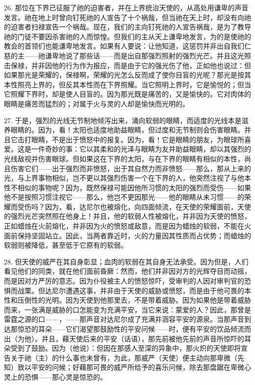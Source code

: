 26. 那位在下界已征服了祂的迫害者，并在上界统治天使的，从高处用谦卑的声音发言。祂在地上时曾向钉死祂的人宣告了十个祸哉，但当祂在天上时，却没有向祂的迫害者扫禄宣告一个祸哉。现在，我们的主向钉死祂的人宣告祸哉，是为了教导祂的门徒不要因杀害祂的人而惊惶。但我们的主从天上谦卑地发言，为的是使祂的教会的首领们也能谦卑地发言。如果有人要说：让他知道，这惩罚并非出自我们仁慈的主——祂谦卑地说了那些话——而是出自那强烈照射的强烈光芒。并且这光照击保禄，并非因他的行为作为报应，而是由于它的强光伤了他，正如他也说过：但如果那光是荣耀的，保禄啊，荣耀的光怎么反而成了使你目盲的光呢？那光是按其本性照亮上界的，但反其本性而在下界照耀。当它照明上界时，它是愉悦的；但当它照耀下界时，却是使人目盲的。因为那光既是痛苦的，又是愉快的。它对肉体的眼睛是痛苦而猛烈的；对属于火与灵的人却是愉快而光明的。\par

27. 于是，强烈的光线无节制地倾泻出来，涌向软弱的眼睛，而适度的光线本是滋养眼睛的。因为，看！太阳也适度地助益眼睛，但过度和无节制则会伤害眼睛。并且它击打眼睛，不是出于愤怒中的报复。因为，看！它是眼睛的朋友，为眼球所喜爱。这是一件奇妙的事：它以其柔和的光泽与眼睛为友并助益眼睛，却以其强烈的光线敌视并伤害眼球。但如果这在下界的太阳，与在下界的眼睛有相似的本性，尚且伤害它们——出于强烈而非愤怒，出于其自然力而非愤怒——那么，那从上来的光，与上界事物相似，岂不更以其强烈伤害一个在下界的人，他突然注视了与他本性不相似的事物呢？因为，既然保禄可能因他所习惯的太阳的强烈而受伤——如果他不是按照习惯注视它——那么，他岂不更因那光——他的眼睛从未习惯——的荣耀而受伤吗？因为，看，达尼尔也被熔化，向四面倾流，在天使的荣耀面前，天使的强烈光芒突然照在他身上！并且，他的软弱人性被熔化，并非因为天使的愤怒，正如蜡烛在火前熔化，并非因为火的愤怒或敌意，而是因为蜡烛的软弱，不能在火面前保持坚固站立。因此，当两者靠近时，火的力量因其性质而占优势；而蜡烛的软弱则被降低，甚至低于它原有的软弱。\par

28. 但天使的威严在其自身彰显；血肉的软弱在其自身无法承受。因为但是，人们看见他们的同类，就在他们面前昏厥：然而，他们并非因对方的光辉夺目而动摇，而是因对方严厉的意志。因为仆役被主人的愤怒惊吓，受审判的人因对审判官的恐惧而战栗。但达尼尔遭遇这事，并非由于天使的威胁或愤怒，而是由于他可畏的本性和压倒性的光明。因为天使到他那里去，不是带着威胁。因为如果他是带着威胁而来，一张满是威胁的口怎能变为充满平安，当它来说：蒙爱的人？因此，那曾是雷霆之源的口——，——那声音对达尼尔成了充满并涵容平安的源泉。当那声音到达那惊恐的耳朵——它们渴望那鼓励性的平安问候——时，便有平安的饮品倾流而出（为他）。并且，藉天使后来的平安（话语），那先前被他先前的声音所惊吓的耳朵受到了鼓励。因为（他说）：但因在那感人至深的异象中，那火炽的天使即将宣告关于祂（主）的什么事也未曾有，为此，那威严（天使）便主动向那卑微（先知）致以平安的问候；好藉那可畏的威严所给予的喜乐问候，除去那盘踞在卑微心灵上的恐惧——那心灵是惊恐的。\par

